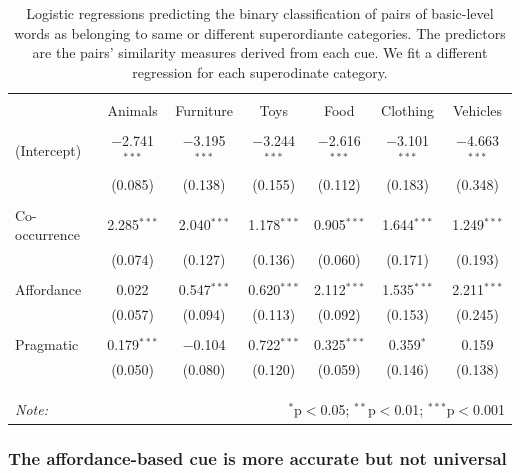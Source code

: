 \documentclass[10pt, letterpaper]{article}
\begin{document}
\begin{table}[!htbp] \centering 
  \caption{\label{tab:regressions} Logistic regressions predicting the binary classification of pairs of basic-level words as belonging to same or different superordiante categories. The predictors are the pairs' similarity measures derived from each cue. We fit a different regression for each superodinate category.} 
  \label{} 
\begin{tabular}{@{\extracolsep{5pt}}lcccccc} 
\hline 
 & \multicolumn{6}{c}{} \\
 & Animals & Furniture & Toys & Food & Clothing & Vehicles \\ 
\hline \\[-1.8ex] 
 (Intercept) & $-$2.741$^{***}$ & $-$3.195$^{***}$ & $-$3.244$^{***}$ & $-$2.616$^{***}$ & $-$3.101$^{***}$ & $-$4.663$^{***}$ \\ 
  & (0.085) & (0.138) & (0.155) & (0.112) & (0.183) & (0.348) \\ 
  & & & & & & \\ 
 Co-occurrence & 2.285$^{***}$ & 2.040$^{***}$ & 1.178$^{***}$ & 0.905$^{***}$ & 1.644$^{***}$ & 1.249$^{***}$ \\ 
  & (0.074) & (0.127) & (0.136) & (0.060) & (0.171) & (0.193) \\ 
  & & & & & & \\ 
 Affordance & 0.022 & 0.547$^{***}$ & 0.620$^{***}$ & 2.112$^{***}$ & 1.535$^{***}$ & 2.211$^{***}$ \\ 
  & (0.057) & (0.094) & (0.113) & (0.092) & (0.153) & (0.245) \\ 
  & & & & & & \\ 
 Pragmatic & 0.179$^{***}$ & $-$0.104 & 0.722$^{***}$ & 0.325$^{***}$ & 0.359$^{*}$ & 0.159 \\ 
  & (0.050) & (0.080) & (0.120) & (0.059) & (0.146) & (0.138) \\ 
  & & & & & & \\ 
 \\[-1.8ex] 

\hline \\[-1.8ex] 
\textit{Note:}  & \multicolumn{6}{r}{$^{*}$p$<$0.05; $^{**}$p$<$0.01; $^{***}$p$<$0.001} \\ 
\end{tabular} 
\end{table}

\hypertarget{the-affordance-based-cue-is-more-accurate-but-not-universal}{%
\subsubsection{The affordance-based cue is more accurate but not
universal}\label{the-affordance-based-cue-is-more-accurate-but-not-universal}}
\end{document}
